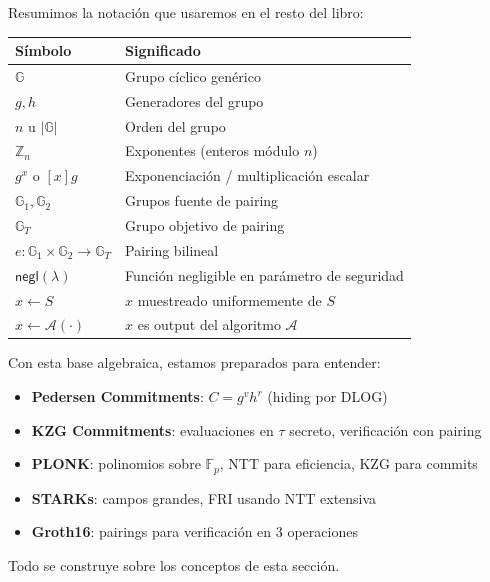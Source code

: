 \documentclass[11pt,a4paper,twoside,openright]{book}
\theoremstyle{definition}
\theoremstyle{plain}
\theoremstyle{remark}
\begin{document}
Resumimos la notación que usaremos en el resto del libro:

\begin{center}
\begin{tabular}{ll}
\toprule
\textbf{Símbolo} & \textbf{Significado} \\
\midrule
$\mathbb{G}$ & Grupo cíclico genérico \\
$g, h$ & Generadores del grupo \\
$n$ u $|\mathbb{G}|$ & Orden del grupo \\
$\mathbb{Z}_n$ & Exponentes (enteros módulo $n$) \\
$g^x$ o $[x]g$ & Exponenciación / multiplicación escalar \\
$\mathbb{G}_1, \mathbb{G}_2$ & Grupos fuente de pairing \\
$\mathbb{G}_T$ & Grupo objetivo de pairing \\
$e: \mathbb{G}_1 \times \mathbb{G}_2 \to \mathbb{G}_T$ & Pairing bilineal \\
$\mathsf{negl}(\lambda)$ & Función negligible en parámetro de seguridad \\
$x \leftarrow S$ & $x$ muestreado uniformemente de $S$ \\
$x \leftarrow \mathcal{A}(\cdot)$ & $x$ es output del algoritmo $\mathcal{A}$ \\
\bottomrule
\end{tabular}
\end{center}

\begin{bancozk}
Con esta base algebraica, estamos preparados para entender:
\begin{itemize}
    \item \textbf{Pedersen Commitments}: $C = g^v h^r$ (hiding por DLOG)
    \item \textbf{KZG Commitments}: evaluaciones en $\tau$ secreto, verificación con pairing
    \item \textbf{PLONK}: polinomios sobre $\mathbb{F}_p$, NTT para eficiencia, KZG para commits
    \item \textbf{STARKs}: campos grandes, FRI usando NTT extensiva
    \item \textbf{Groth16}: pairings para verificación en 3 operaciones
\end{itemize}
Todo se construye sobre los conceptos de esta sección.
\end{bancozk}

\end{document}
